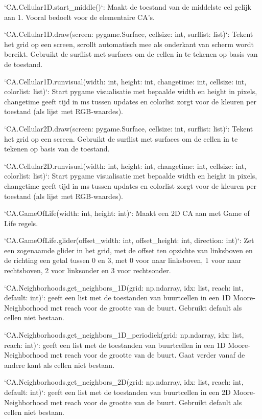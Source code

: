 \documentclass{article}
\begin{document}
\begin{markdown}
`CA.Cellular1D.start_middle()`: Maakt de toestand van de middelste cel gelijk aan 1. Vooral bedoelt voor de elementaire CA's.

`CA.Cellular1D.draw(screen: pygame.Surface, cellsize: int, surflist: list)`: Tekent het grid op een screen, scrollt automatisch mee als onderkant van scherm wordt bereikt. Gebruikt de surflist met surfaces om de cellen in te tekenen op basis van de toestand.

`CA.Cellular1D.runvisual(width: int, height: int, changetime: int, cellsize: int, colorlist: list)`: Start pygame visualisatie met bepaalde width en height in pixels, changetime geeft tijd in ms tussen updates en colorlist zorgt voor de kleuren per toestand (als lijst met RGB-waardes).

`CA.Cellular2D.draw(screen: pygame.Surface, cellsize: int, surflist: list)`: Tekent het grid op een screen. Gebruikt de surflist met surfaces om de cellen in te tekenen op basis van de toestand.

`CA.Cellular2D.runvisual(width: int, height: int, changetime: int, cellsize: int, colorlist: list)`: Start pygame visualisatie met bepaalde width en height in pixels, changetime geeft tijd in ms tussen updates en colorlist zorgt voor de kleuren per toestand (als lijst met RGB-waardes).

`CA.GameOfLife(width: int, height: int)`: Maakt een 2D CA aan met Game of Life regels.

`CA.GameOfLife.glider(offset_width: int, offset_height: int, direction: int)`: Zet een zogenaamde glider in het grid, met de offset ten opzichte van linksboven en de richting een getal tussen 0 en 3, met 0 voor naar linksboven, 1 voor naar rechtsboven, 2 voor linksonder en 3 voor rechtsonder.

`CA.Neighborhoods.get_neighbors_1D(grid: np.ndarray, idx: list, reach: int, default: int)`: geeft een list met de toestanden van buurtcellen in een 1D Moore-Neighborhood met reach voor de grootte van de buurt. Gebruikt default als cellen niet bestaan.

`CA.Neighborhoods.get_neighbors_1D_periodiek(grid: np.ndarray, idx: list, reach: int)`: geeft een list met de toestanden van buurtcellen in een 1D Moore-Neighborhood met reach voor de grootte van de buurt. Gaat verder vanaf de andere kant als cellen niet bestaan.

`CA.Neighborhoods.get_neighbors_2D(grid: np.ndarray, idx: list, reach: int, default: int)`: geeft een list met de toestanden van buurtcellen in een 2D Moore-Neighborhood met reach voor de grootte van de buurt. Gebruikt default als cellen niet bestaan.


\end{markdown}
\end{document}
